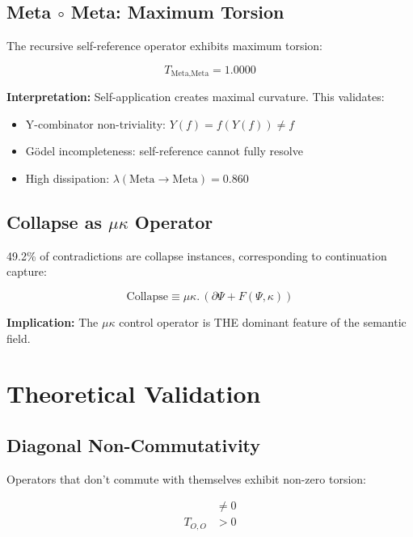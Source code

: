 \documentclass{article}
\begin{document}
\subsection{Meta $\circ$ Meta: Maximum Torsion}

The recursive self-reference operator exhibits maximum torsion:

\begin{equation}
T_{\text{Meta}, \text{Meta}} = 1.0000
\end{equation}

\textbf{Interpretation:} Self-application creates maximal curvature. This validates:
\begin{itemize}
    \item Y-combinator non-triviality: $Y(f) = f(Y(f)) \neq f$
    \item Gödel incompleteness: self-reference cannot fully resolve
    \item High dissipation: $\lambda(\text{Meta} \to \text{Meta}) = 0.860$
\end{itemize}

\subsection{Collapse as $\mu\kappa$ Operator}

49.2\% of contradictions are collapse instances, corresponding to continuation capture:

\begin{equation}
\text{Collapse} \equiv \mu\kappa. \, (\partial\Psi + F(\Psi, \kappa))
\end{equation}

\textbf{Implication:} The $\mu\kappa$ control operator is THE dominant feature of the semantic field.

\section{Theoretical Validation}

\subsection{Diagonal Non-Commutativity}

Operators that don't commute with themselves exhibit non-zero torsion:

\begin{align}
[O, O] &\neq 0 \\
T_{O,O} &> 0
\end{align}
\end{document}
